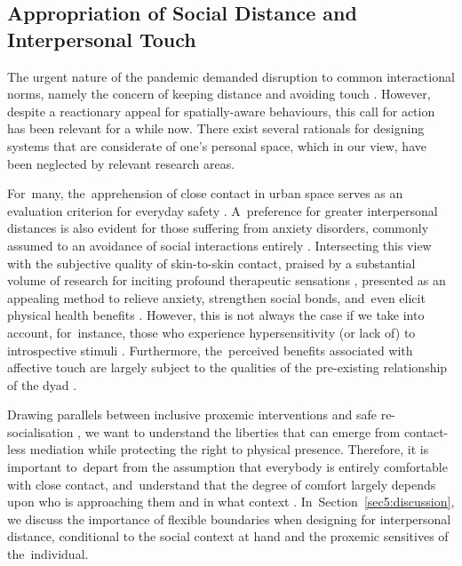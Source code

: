 \subsection*{Appropriation of Social Distance and Interpersonal Touch}
\label{subsec:safety}

The urgent nature of the pandemic demanded disruption to common interactional norms, namely the concern of keeping distance and avoiding touch \citep{long_covid-19_2021,katila_interaction_2020}. However, despite a reactionary appeal for spatially-aware behaviours, this call for action has been relevant for a while now. There exist several rationals for designing systems that are considerate of one's personal space, which in our view, have been neglected by relevant research areas.

For~many, the~apprehension of close contact in urban space serves as an evaluation criterion for everyday safety \citep{farina_moving_2021,peimani_where_2016}. A~preference for greater interpersonal distances is also evident for those suffering from anxiety disorders, commonly assumed to an avoidance of social interactions entirely \citep{givon-benjio_biased_2020}. Intersecting this view with the subjective quality of skin-to-skin contact, praised by a substantial volume of research for inciting profound therapeutic sensations \citep{crucianelli_developmental_2020}, presented as an appealing method to relieve anxiety, strengthen social bonds, and~even elicit physical health benefits \citep{field_touch_2010,peterson_parents_2007,dolin_reach_1993}. However, this is not always the case if we take into account, for~instance, those who experience hypersensitivity (or lack of) to introspective stimuli \citep{bischoff-grethe_neural_2018,sivik_alexithymia_1993}. Furthermore, the~perceived benefits associated with affective touch are largely subject to the qualities of the pre-existing relationship of the dyad \citep{gulledge2007non}.

Drawing parallels between inclusive proxemic interventions and safe re-socialisation \citep{long_covid-19_2021}, we want to understand the liberties that can emerge from contact-less mediation while protecting the right to physical presence. Therefore, it is important to~depart from the assumption that everybody is entirely comfortable with close contact, and~understand that the degree of comfort largely depends upon who is approaching them and in what context \citep{matsumoto_gender_2016,suvilehto_topography_2015}. In~Section~\ref{sec5:discussion}, we discuss the importance of flexible boundaries when designing for interpersonal distance, conditional to the social context at hand and the proxemic sensitives of the~individual.

